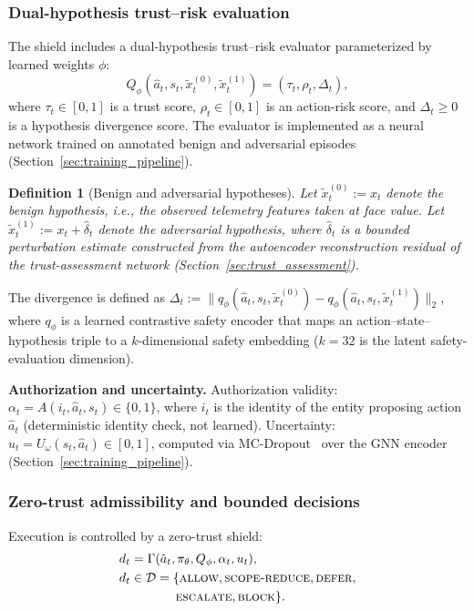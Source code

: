 \documentclass[10pt,journal,compsoc]{IEEEtran}
\newtheorem{definition}{Definition}
\begin{document}
\subsubsection{Dual-hypothesis trust--risk evaluation}
\label{sec:dual_hypothesis}
The shield includes a dual-hypothesis trust--risk evaluator parameterized by learned weights $\phi$:
\[
Q_\phi(\hat{a}_t, s_t, \tilde{x}_t^{(0)}, \tilde{x}_t^{(1)}) = (\tau_t, \rho_t, \Delta_t),
\]
where $\tau_t \in [0,1]$ is a trust score, $\rho_t \in [0,1]$ is an action-risk score, and $\Delta_t \ge 0$ is a hypothesis divergence score.
The evaluator is implemented as a neural network trained on annotated benign and adversarial episodes (Section~\ref{sec:training_pipeline}).

\begin{definition}[Benign and adversarial hypotheses]
Let $\tilde{x}_t^{(0)} := x_t$ denote the \emph{benign hypothesis}, i.e., the observed telemetry features taken at face value.
Let $\tilde{x}_t^{(1)} := x_t + \hat{\delta}_t$ denote the \emph{adversarial hypothesis}, where $\hat{\delta}_t$ is a bounded perturbation estimate constructed from the autoencoder reconstruction residual of the trust-assessment network (Section~\ref{sec:trust_assessment}).
\end{definition}

\noindent The divergence is defined as $\Delta_t := \| q_\phi(\hat{a}_t, s_t, \tilde{x}_t^{(0)}) - q_\phi(\hat{a}_t, s_t, \tilde{x}_t^{(1)}) \|_2$, where $q_\phi$ is a learned contrastive safety encoder that maps an action--state--hypothesis triple to a $k$-dimensional safety embedding ($k = 32$ is the latent safety-evaluation dimension).

\noindent\textbf{Authorization and uncertainty.}
Authorization validity: $\alpha_t = A(i_t, \hat{a}_t, s_t) \in \{0,1\}$, where $i_t$ is the identity of the entity proposing action $\hat{a}_t$ (deterministic identity check, not learned).
Uncertainty: $u_t = U_\omega(s_t, \hat{a}_t) \in [0,1]$, computed via MC-Dropout~\cite{gal2016dropout} over the GNN encoder (Section~\ref{sec:training_pipeline}).

\subsubsection{Zero-trust admissibility and bounded decisions}
Execution is controlled by a zero-trust shield:
\begin{align*}
d_t &= \Gamma(\hat{a}_t, \pi_\theta, Q_\phi, \alpha_t, u_t),\\
d_t &\in \mathcal{D} = \{\textsc{allow},\textsc{scope-reduce},\textsc{defer},\\
    &\qquad\quad\;\;\textsc{escalate},\textsc{block}\}.
\end{align*}
\end{document}
